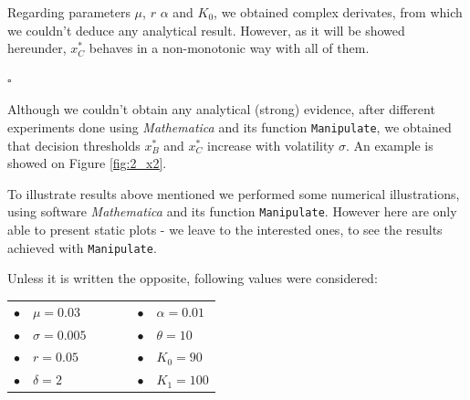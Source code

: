 Regarding parameters $\mu$, $r$ $\alpha$ and $K_0$, we obtained complex derivates, from which we couldn't deduce any analytical result. However, as it will be showed hereunder, $x^*_C$ behaves in a non-monotonic way with all of them.
\begin{flushright}
	$\square$
\end{flushright}


Although we couldn't obtain any analytical (strong) evidence, after different experiments done using \textit{Mathematica} and its function \texttt{Manipulate}, we obtained that decision thresholds $x^*_B$ and $x^*_C$ increase with volatility $\sigma$. An example is showed on Figure \ref{fig:2_x2}.



To illustrate results above mentioned we performed some numerical illustrations, using software \textit{Mathematica} and its function \texttt{Manipulate}. However here are only able to present static plots - we leave to the interested ones, to see the results achieved with \texttt{Manipulate}.

Unless it is written the opposite, following values were considered:
\begin{table}[!htb]
	\centering
	\begin{tabular}{lllllll}
		$\bullet$ & $\mu=0.03$     &  & \hspace{7cm} &  &  $\bullet$ & $\alpha=0.01$ \\
		$\bullet$ & $\sigma=0.005$ &  & \hspace{7cm} &  &  $\bullet$ & $\theta=10$   \\
		$\bullet$ & $r=0.05$       &  & \hspace{7cm} &  &  $\bullet$ & $K_0=90$       \\
		$\bullet$ & $\delta=2$     &  & \hspace{7cm} & &  $\bullet$ & $K_1=100$                                   
	\end{tabular}
\end{table}



